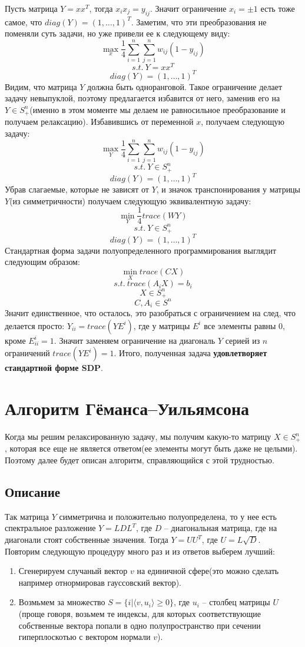 \documentclass[12pt, a4paper]{article}
\begin{document}
Пусть матрица $Y=xx^T$, тогда $x_i x_j = y_{ij}$. Значит ограничение $x_i = \pm 1$ есть тоже самое, что $diag(Y) = (1, \dots, 1)^T$. Заметим, что эти преобразования не поменяли суть задачи, но уже привели ее к следующему виду:
$$\max \limits_{x} \frac{1}{4} \sum_{i = 1}^{n} \sum_{j = 1}^{n} w_{ij}(1 - y_{ij})$$
$$s.t.\: Y = xx^T$$
$$diag(Y) = (1, \dots, 1)^T$$
Видим, что матрица $Y$ должна быть одноранговой. Такое ограничение делает задачу невыпуклой, поэтому предлагается избавится от него, заменив его на $Y \in S^n_+$(именно в этом моменте мы делаем не равносильное преобразование и получаем релаксацию). Избавившись от переменной $x$, получаем следующую задачу:
$$\max \limits_{Y} \frac{1}{4} \sum_{i = 1}^{n} \sum_{j = 1}^{n} w_{ij}(1 - y_{ij})$$
$$s.t.\: Y \in S_+^n$$
$$diag(Y) = (1, \dots, 1)^T$$
Убрав слагаемые, которые не зависят от $Y$, и значок транспонирования у матрицы $Y$(из симметричности) получаем следующую эквивалентную задачу:
$$\min \limits_{Y} \frac{1}{4} trace(WY)$$
$$s.t.\: Y \in S_+^n$$
$$diag(Y) = (1, \dots, 1)^T$$
Стандартная форма задачи полуопределенного программирования выглядит следующим образом:
$$\min \limits_{X} trace(CX)$$
$$s.t.\: trace(A_i X) = b_i$$
$$X \in S_+^n$$
$$C, A_i \in S^n$$
Значит единственное, что осталось, это разобраться с ограничением на след, что делается просто:
$Y_{ii} = trace(Y E^i)$, где у матрицы $E^i$ все элементы равны $0$, кроме $E^i_{ii} = 1$. Значит заменяем ограничение на диагональ $Y$ серией из $n$ ограничений $trace(Y E^i) = 1$. Итого, полученная задача \textbf{удовлетворяет стандартной форме SDP}.

\section{Алгоритм Гёманса–Уильямсона}
Когда мы решим релаксированную задачу, мы получим какую-то матрицу $X \in S^n_+$, которая все еще не является ответом(ее элементы могут быть даже не целыми). Поэтому далее будет описан алгоритм, справляющийся с этой трудностью.
\subsection{Описание}
Так матрица $Y$ симметрична и положительно полуопределена, то у нее есть спектральное разложение $Y = LDL^T$, где $D$ -- диагональная матрица, где на диагонали стоят собственные значения. Тогда $Y = UU^T$, где $U = L\sqrt{D}$.\\

Повторим следующую процедуру много раз и из ответов выберем лучший:
\begin{enumerate}
    \item
    Сгенерируем случаный вектор $v$ на единичной сфере(это можно сделать например отнормировав гауссовский вектор).
    \item
    Возмьмем за множество $S = \{i|\langle v, u_i \rangle \geqslant 0 \}$, где $u_i$ -- столбец матрицы $U$(проще говоря, возьмем те индексы, для которых соответствующие собственные вектора попали в одно полупространство при сечении гиперплоскотью с вектором нормали $v$).
\end{enumerate}
\end{document}
